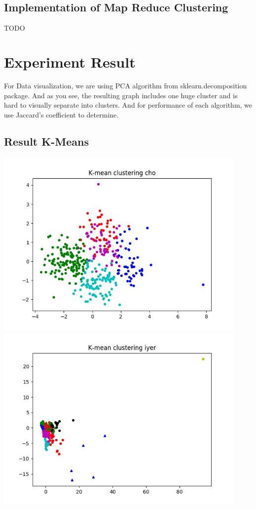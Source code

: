 \documentclass[fleqn]{llncs}
\begin{document}
\subsection{Implementation of Map Reduce Clustering}
TODO
\section{Experiment Result}


For Data visualization, we are using PCA algorithm from sklearn.decomposition package. And as you see, the resulting graph includes one huge cluster and is hard to visually separate into clusters. And for performance of each algorithm, we use Jaccard's coefficient to determine.

\subsection{Result K-Means}

\includegraphics[width=350pt]{k_meancho.jpg}\\
\includegraphics[width=350pt]{k_meaniyer.jpg}
\end{document}
